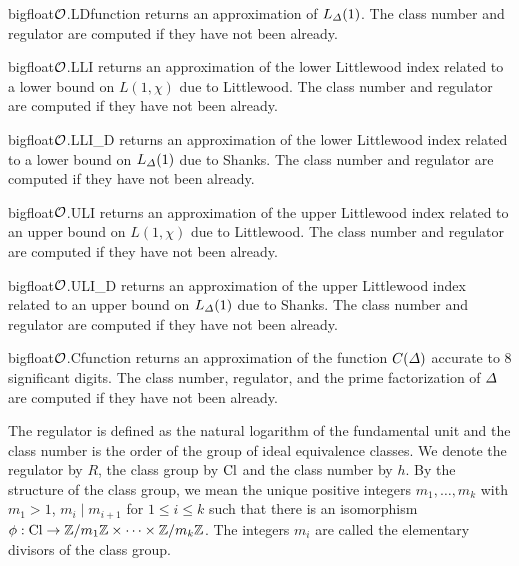 \begin{fcode}{bigfloat}{$\mathcal{O}$.LDfunction}{}
  returns an approximation of $L_{\varDelta}(1)$.  The class number and regulator are computed if they
  have not been already.
\end{fcode}

\begin{fcode}{bigfloat}{$\mathcal{O}$.LLI}{}
  returns an approximation of the lower Littlewood index related to a lower bound on $L(1,
  \chi)$ due to Littlewood.  The class number and regulator are computed if they have not been
  already.
\end{fcode}

\begin{fcode}{bigfloat}{$\mathcal{O}$.LLI_D}{}
  returns an approximation of the lower Littlewood index related to a lower bound on $L_{\varDelta}(1)$
  due to Shanks.  The class number and regulator are computed if they have not been already.
\end{fcode}

\begin{fcode}{bigfloat}{$\mathcal{O}$.ULI}{}
  returns an approximation of the upper Littlewood index related to an upper bound on $L(1,
  \chi)$ due to Littlewood.  The class number and regulator are computed if they have not been
  already.
\end{fcode}

\begin{fcode}{bigfloat}{$\mathcal{O}$.ULI_D}{}
  returns an approximation of the upper Littlewood index related to an upper bound on
  $L_{\varDelta}(1)$ due to Shanks.  The class number and regulator are computed if they have not been
  already.
\end{fcode}

\begin{fcode}{bigfloat}{$\mathcal{O}$.Cfunction}{}
  returns an approximation of the function $C(\varDelta)$ accurate to 8 significant digits.  The class
  number, regulator, and the prime factorization of $\varDelta$ are computed if they have not been
  already.
\end{fcode}




The regulator is defined as the natural logarithm of the fundamental unit and the class number
is the order of the group of ideal equivalence classes.  We denote the regulator by $R$, the
class group by $\mathrm{Cl}$ and the class number by $h$.  By the structure of the class group, we mean
the unique positive integers $m_1, \dots, m_k$ with $m_1 > 1$, $m_i \mid m_{i+1}$ for $1 \leq i
\leq k$ such that there is an isomorphism $\phi : \mathrm{Cl} \rightarrow \mathbb{Z} /m_1 \mathbb{Z} \times \dots
\times \mathbb{Z} /m_k \mathbb{Z}$.  The integers $m_i$ are called the elementary divisors of the class
group.

